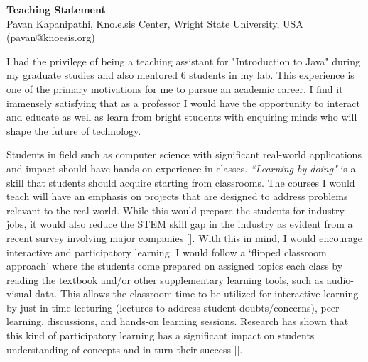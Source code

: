 \documentclass[12pt]{letter} %
\begin{document}


{\large\bf Teaching Statement} \\ %
Pavan Kapanipathi, Kno.e.sis Center, Wright State University, USA (pavan@knoesis.org)

\noindent\makebox[\linewidth]{\rule{\linewidth}{0.4pt}}
\vspace{0.1in}

I had the privilege of being a teaching assistant for "Introduction to Java" during my graduate studies and also mentored 6 students in my lab. This experience is one of the primary motivations for me to pursue an academic career. I find it immensely satisfying that as a professor I would have the opportunity to interact and educate as well as learn from bright students with enquiring minds who will shape the future of technology.

Students in field such as computer science with significant real-world applications and impact should have hands-on experience in classes. \textit{``Learning-by-doing"} is a skill that students should acquire starting from classrooms. The courses I would teach will have an emphasis on projects that are designed to address problems relevant to the real-world. While this would prepare the students for industry jobs, it would also reduce the STEM skill gap in the industry as evident from a recent survey involving major companies []. With this in mind, I would encourage  interactive and participatory learning. I would follow a ‘flipped classroom approach’ where the students come prepared on assigned topics each class by reading the textbook and/or other supplementary learning tools, such as audio-visual data. This allows the classroom time to be  utilized for interactive learning by just-in-time lecturing (lectures to address student doubts/concerns), peer learning, discussions, and hands-on learning sessions. Research has shown that this kind of participatory learning has a significant impact on students understanding of concepts and in turn their success []. 
\end{document}
